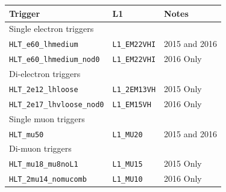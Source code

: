 \begin{table}[hbt]
\begin{center}
\begin{tabular}{|lll|}
\hline
Trigger                                       & L1                   & Notes \\ 
\hline\hline
\multicolumn{3}{|l|}{Single electron triggers} \\
\hline
\texttt{HLT\_e60\_lhmedium}                   & \texttt{L1\_EM22VHI} & 2015 and 2016 \\
\texttt{HLT\_e60\_lhmedium\_nod0}             & \texttt{L1\_EM22VHI} & 2016 Only \\
\hline
\multicolumn{3}{|l|}{Di-electron triggers} \\
\hline
\texttt{HLT\_2e12\_lhloose}                   & \texttt{L1\_2EM13VH} & 2015 Only \\
\texttt{HLT\_2e17\_lhvloose\_nod0}            & \texttt{L1\_EM15VH}  & 2016 Only \\
\hline\hline
\multicolumn{3}{|l|}{Single muon triggers} \\
\hline
\texttt{HLT\_mu50}                            & \texttt{L1\_MU20}    & 2015 and 2016 \\
\hline
\multicolumn{3}{|l|}{Di-muon triggers} \\
\hline
\texttt{HLT\_mu18\_mu8noL1}                   & \texttt{L1\_MU15}    & 2015 Only \\
\texttt{HLT\_2mu14\_nomucomb}                 & \texttt{L1\_MU10}    & 2016 Only \\

\end{tabular}
\end{center}
\end{table}
